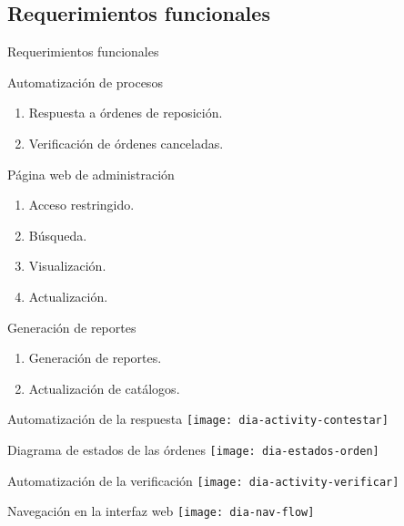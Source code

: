 \subsection{Requerimientos funcionales}
	\begin{frame}{Requerimientos funcionales}
		\begin{block}{Automatización de procesos}
			\begin{enumerate}
				\item Respuesta a órdenes de reposición.
				\item Verificación de órdenes canceladas.
			\end{enumerate}
		\end{block}
		\begin{block}{Página web de administración}
			\begin{multicols}{2}
				\begin{enumerate}
					\item Acceso restringido.
					\item Búsqueda.
					\item Visualización.
					\item Actualización.
				\end{enumerate}
			\end{multicols}
		\end{block}
		\begin{block}{Generación de reportes}
			\begin{enumerate}
				\item Generación de reportes.
				\item Actualización de catálogos.
			\end{enumerate}
		\end{block}
	\end{frame}
	\begin{frame}{Automatización de la respuesta}
		\centering
		\texttt{[image: dia-activity-contestar]}
	\end{frame}
	\begin{frame}{Diagrama de estados de las órdenes}
		\centering
		\texttt{[image: dia-estados-orden]} 
	\end{frame}
	\begin{frame}{Automatización de la verificación}
		\centering
		\texttt{[image: dia-activity-verificar]}
	\end{frame}
	\begin{frame}{Navegación en la interfaz web}
		\centering
		\texttt{[image: dia-nav-flow]}
	\end{frame}
